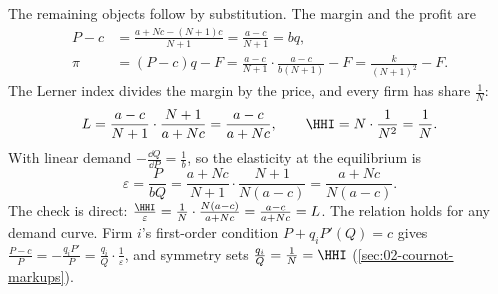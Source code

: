 The remaining objects follow by substitution. The margin and the profit are
\begin{align}
P - c &= \frac{a + Nc - (N + 1)c}{N + 1} = \frac{a - c}{N + 1} = bq, \label{eq:C-cournot-margin}\\
\pi &= (P - c)q - F = \frac{a - c}{N + 1}\cdot\frac{a - c}{b(N + 1)} - F = \frac{k}{(N + 1)^2} - F .
\label{eq:C-cournot-pi}
\end{align}
The Lerner index divides the margin by the price, and every firm has share $\frac{1}{N}$:
\begin{equation}\label{eq:C-cournot-LH}
L = \frac{a - c}{N + 1}\cdot\frac{N + 1}{a + Nc} = \frac{a - c}{a + Nc}, \qquad
\HHI = N\cdot\frac{1}{N^2} = \frac{1}{N}.
\end{equation}
With linear demand $-\frac{\dd Q}{\dd P} = \frac{1}{b}$, so the elasticity at the equilibrium is
\begin{equation*}
\varepsilon = \frac{P}{bQ} = \frac{a + Nc}{N + 1}\cdot\frac{N + 1}{N(a - c)} = \frac{a + Nc}{N(a - c)} .
\end{equation*}
The check is direct:
$\frac{\HHI}{\varepsilon} = \frac{1}{N}\cdot\frac{N(a - c)}{a + Nc} = \frac{a - c}{a + Nc} = L$. The relation
holds for any demand curve. Firm $i$'s first-order condition $P + q_iP'(Q) = c$ gives
$\frac{P - c}{P} = -\frac{q_iP'}{P} = \frac{q_i}{Q}\cdot\frac{1}{\varepsilon}$, and symmetry sets
$\frac{q_i}{Q} = \frac{1}{N} = \HHI$ (\cref{sec:02-cournot-markups}).

